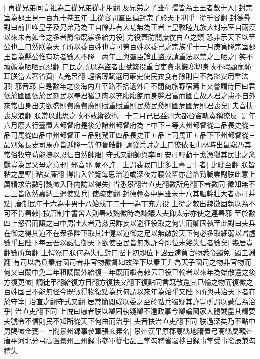 |{
	再從兄弟同高祖為三從兄弟從才用翻}
及兄弟之子雖童孺皆為王王者數十人|{
	封宗室為郡王見一百九十卷五年}
上從容問羣臣徧封宗子於天下利乎|{
	從千容翻}
封德彞對曰前世唯皇子及兄弟乃為王自餘非有大功無為王者上皇敦睦九族大封宗室自兩漢以來未有如今之多者爵命既崇多給力役|{
	力役蓋防閤庶僕白直之類}
恐非示天下以至公也上曰然朕為天子所以養百姓也豈可勞百姓以養己之宗族乎十一月庚寅降宗室郡王皆為縣公惟有功者數人不降　丙午上與羣臣論止盜或請重法以禁之上哂之|{
	笑不壞顔為哂哂式忍翻}
曰民之所以為盜者由賦繁役重官吏貪求饑寒切身故不暇顧亷恥耳朕當去奢省費|{
	去羌呂翻}
輕徭薄賦選用亷吏使民衣食有餘則自不為盜安用重法邪|{
	邪音耶}
自是數年之後海内升平路不拾遺外戶不閉商旅野宿焉上又嘗謂侍臣曰君依於國國依於民刻民以奉君猶割肉以充腹腹飽而身斃君富而國亡故人君之患不自外來常由身出夫欲盛則費廣費廣則賦重賦重則民愁民愁則國危國危則君喪矣|{
	夫音扶喪息浪翻}
朕常以此思之故不敢縱欲也　十二月己巳益州大都督竇軌奏稱獠反|{
	是年六月廢大行臺置大都督府是後分諸州都督府為上中下三等大州都督從二品長史從三品司馬從四品中州都督正三品别駕正四品長史正五品上司馬正五品下下州都督從三品别駕長史司馬亦皆逓降一等僚魯皓翻}
請發兵討之上曰獠依阻山林時出鼠竊乃其常俗牧守苟能撫以恩信自然帥服|{
	守式又翻帥與率同}
安可輕動干戈漁獵其民比之禽獸豈為民父母之意邪|{
	邪音耶}
竟不許　上謂裴寂曰比多上書言事者|{
	比毗至翻}
朕皆粘之屋壁|{
	粘女亷翻}
得出入省覽每思治道或深夜方寢公輩亦當恪勤職業副朕此意上厲精求治數引魏徵入卧内訪以得失|{
	省悉景翻治直吏翻數所角翻下者數同}
徵知無不言上皆欣然嘉納上遣使點兵|{
	使疏吏翻}
封德彝奏中男雖未十八其軀幹壯大者亦可并點|{
	唐制民年十六為中男十八始成丁二十一為丁充力役}
上從之敕出魏徵固執以為不可不肯署敕|{
	按唐制中書舍人則署敕魏徵時為諫議大夫抑太宗亦使之連署邪}
至於數四上怒召而讓之曰中男壯大者乃姦民詐妄以避征役取之何害而卿固執至此對曰夫兵在御之得其道不在衆多陛下取其壯健以道御之足以無敵於天下何必多取細弱以增虚數乎且陛下每云吾以誠信御天下欲使臣民皆無欺詐今即位未幾失信者數矣|{
	幾居豈翻數所角翻}
上愕然曰朕何為失信對曰陛下初即位下詔云逋負官物悉令蠲免|{
	蠲圭淵翻}
有司以為負秦府國司者非官物徵督如故陛下以秦王升為天子國司之物非官物而何又曰關中免二年租調關外給復一年既而繼有敕云已役已輸者以來年為始散還之後方復更徵|{
	調徒弔翻給復方目翻方復扶又翻下復點同言既散還其已輸之物而復徵之}
百姓固已不能無怪今既徵得物復點為兵何謂以來年為始乎又陛下所與共治天下者在於守宰|{
	治直之翻守式又翻}
居常簡閲咸以委之至於點兵獨疑其詐豈所謂以誠信為治乎|{
	治直吏翻下同}
上悦曰曏者朕以卿固執疑卿不達政事今卿論國家大體誠盡其精要夫號令不信則民不知所從天下何由而治乎|{
	夫音扶治直吏翻下同}
朕過深矣乃不點中男賜徵金甕一上聞景州録事參軍張玄素名|{
	景州漢平原郡鬲縣地隋置弓高縣屬觀州唐平河北分弓高置景州上州録事參軍從七品上掌勾稽省署抄目録事掌受事發辰兼勾稽失}
